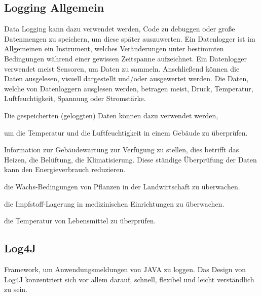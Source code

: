 \subsection{Logging Allgemein}
Data Logging kann dazu verwendet werden, Code zu debuggen oder große Datenmengen zu speichern, um diese später auszuwerten. Ein Datenlogger ist im Allgemeinen ein Instrument, welches Veränderungen unter bestimmten Bedingungen während einer gewissen Zeitspanne aufzeichnet. Ein Datenlogger verwendet meist Sensoren, um Daten zu sammeln. Anschließend können die Daten ausgelesen, visuell dargestellt und/oder ausgewertet werden. Die Daten, welche von Datenloggern ausglesen werden, betragen meist, Druck, Temperatur, Luftfeuchtigkeit, Spannung oder Stromstärke. 

Die gespeicherten (geloggten) Daten können dazu verwendet werden, 

\begin{compactitem}
    \item um die Temperatur und die Luftfeuchtigkeit in einem Gebäude zu überprüfen.
    \item Information zur Gebäudewartung zur Verfügung zu stellen, dies betrifft das Heizen, die Belüftung, die Klimatisierung. Diese ständige Überprüfung der Daten kann den Energieverbrauch reduzieren.
    \item die Wachs-Bedingungen von Pflanzen in der Landwirtschaft zu überwachen. 
    \item die Impfstoff-Lagerung in medizinischen Einrichtungen zu überwachen. 
    \item die Temperatur von Lebensmittel zu überprüfen.
\end{compactitem}


\subsection{Log4J}
Framework, um Anwendungsmeldungen von JAVA zu loggen.
Das Design von Log4J konzentriert sich vor allem darauf, schnell, flexibel und leicht verständlich zu sein. 

